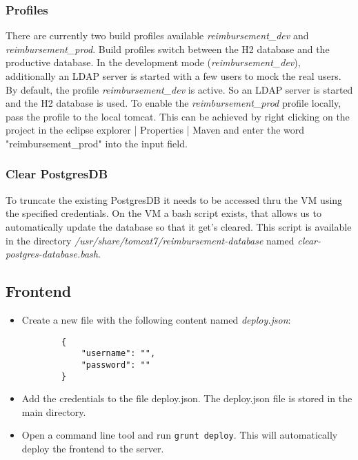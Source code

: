 \subsubsection{Profiles}
There are currently two build profiles available \textit{reimbursement_dev} and \textit{reimbursement_prod}. Build profiles switch between the H2 database and the productive database. In the development mode (\textit{reimbursement_dev}), additionally an LDAP server is started with a few users to mock the real users.\newline
By default, the profile \textit{reimbursement_dev} is active. So an LDAP server is started and the H2 database is used. To enable the \textit{reimbursement_prod} profile locally, pass the profile to the local tomcat. This can be achieved by right clicking on the project in the eclipse explorer | Properties | Maven and enter the word "reimbursement_prod" into the input field.

\subsubsection{Clear PostgresDB}
\label{sec:clear-postgresdb}
To truncate the existing PostgresDB it needs to be accessed thru the VM using the specified credentials. On the VM a bash script exists, that allows us to automatically update the database so that it get's cleared. This script is available in the directory \textit{/usr/share/tomcat7/reimbursement-database} named \textit{clear-postgres-database.bash}.

\subsection{Frontend}

\begin{itemize}

    \item Create a new file with the following content named \textit{deploy.json}:
    \begin{lstlisting}
        {
            "username": "",
            "password": ""
        }
    \end{lstlisting}
    \item Add the credentials to the file deploy.json. The deploy.json file is stored in the main directory.
    \item Open a command line tool and run \texttt{grunt deploy}. This will automatically deploy the frontend to the server.

\end{itemize}

